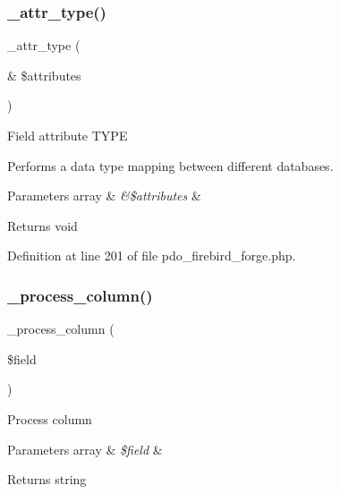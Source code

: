 \subsubsection{\texorpdfstring{\_attr\_type()}{\_attr\_type()}}
{\footnotesize\ttfamily \+\_\+attr\+\_\+type (\begin{DoxyParamCaption}\item[{\&}]{\$attributes }\end{DoxyParamCaption})\hspace{0.3cm}{\ttfamily [protected]}}

Field attribute T\+Y\+PE

Performs a data type mapping between different databases.


\begin{DoxyParams}[1]{Parameters}
array & {\em \&\$attributes} & \\
\hline
\end{DoxyParams}
\begin{DoxyReturn}{Returns}
void 
\end{DoxyReturn}


Definition at line 201 of file pdo\+\_\+firebird\+\_\+forge.\+php.

\mbox{\label{class_c_i___d_b__pdo__firebird__forge_a8f38f1c5b5dddecca4befbe393f3f299}} 
\subsubsection{\texorpdfstring{\_process\_column()}{\_process\_column()}}
{\footnotesize\ttfamily \+\_\+process\+\_\+column (\begin{DoxyParamCaption}\item[{}]{\$field }\end{DoxyParamCaption})\hspace{0.3cm}{\ttfamily [protected]}}

Process column


\begin{DoxyParams}[1]{Parameters}
array & {\em \$field} & \\
\hline
\end{DoxyParams}
\begin{DoxyReturn}{Returns}
string 
\end{DoxyReturn}


